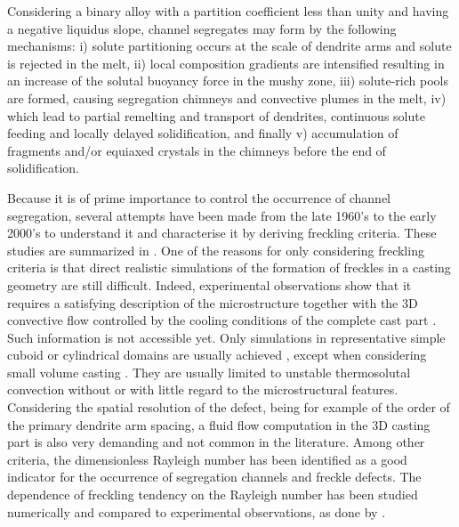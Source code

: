 Considering a binary alloy with a partition coefficient less than unity and having a negative liquidus slope, 
channel segregates may form by the following mechanisms: i) solute partitioning occurs at the scale of dendrite arms and 
solute is rejected in the melt, ii) local composition gradients are intensified resulting in an increase of the 
solutal buoyancy force in the mushy zone, iii) solute-rich pools are formed, causing segregation chimneys and convective plumes in the melt, 
iv) which lead to partial remelting and transport of dendrites, continuous solute feeding and locally delayed solidification,
and finally v) accumulation of fragments and/or equiaxed crystals in the chimneys before the end of solidification.

Because it is of prime importance to control the occurrence of channel segregation, several attempts have been made 
from the late 1960’s \citep{flemings_macrosegregation:_1967, flemings_macrosegregation:_1968-1,flemings_macrosegregation:_1968} 
to the early 2000’s \citep{ramirez_evaluation_2003} to understand it and characterise it by deriving freckling criteria. 
These studies are summarized in \citep{auburtin_determination_1998}. One of the reasons for only considering freckling criteria 
is that direct realistic simulations of the formation of freckles in a casting geometry are still difficult. 
Indeed, experimental observations show that it requires a satisfying description of the microstructure together 
with the 3D convective flow controlled by the cooling conditions of the complete cast part \citep{shevchenko_chimney_2013}. 
Such information is not accessible yet. Only simulations in representative simple cuboid or cylindrical domains are 
usually achieved \citep{felicelli_simulation_1991,felicelli_modeling_1998,kohler_peritectic_2008,guo_three-dimensional_2003}, 
except when considering small volume casting \citep{desbiolles_micro-macrosegregation_2003}. 
They are usually limited to unstable thermosolutal convection without or with 
little regard to the microstructural features. Considering the spatial resolution of the defect, being for example of the 
order of the primary dendrite arm spacing, a fluid flow computation in the 3D casting part is also very demanding and not 
common in the literature. 
Among  other criteria, the dimensionless Rayleigh number has been identified as a good indicator 
for  the occurrence of segregation channels and freckle defects. The dependence of freckling tendency on the 
Rayleigh number has been studied numerically and compared to experimental observations, as done 
by \citep{ramirez_evaluation_2003}.


